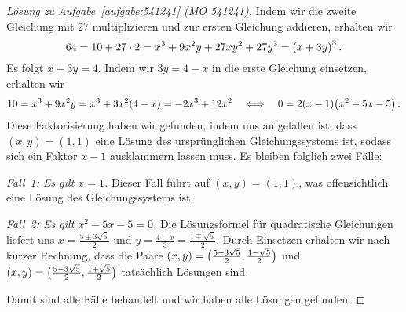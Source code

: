 \begin{proof}[Lösung zu Aufgabe~\ref{aufgabe:541241} \textmd{(\href{https://www.mathematik-olympiaden.de/moev/index.php?option=com_download&thema=a&format=raw&datei=A54124a.pdf}{MO 541241})}]
	Indem wir die zweite Gleichung mit $27$ multiplizieren und zur ersten Gleichung addieren, erhalten wir
	\begin{equation*}
		64=10+27\cdot 2=x^3+9x^2y+27xy^2+27y^3=\parens*{x+3y}^3\,.
	\end{equation*}
	Es folgt $x+3y=4$. Indem wir $3y=4-x$ in die erste Gleichung einsetzen, erhalten wir
	\begin{equation*}
		10=x^3+9x^2y=x^3+3x^2(4-x)=-2x^3+12x^2\quad\Longleftrightarrow\quad 0=2(x-1)\parens*{x^2-5x-5}\,.
	\end{equation*}
	Diese Faktorisierung haben wir gefunden, indem uns aufgefallen ist, dass $(x,y)=(1,1)$ eine Lösung des ursprünglichen Gleichungssystems ist, sodass sich ein Faktor $x-1$ ausklammern lassen muss. Es bleiben folglich zwei Fälle:
	
	\emph{Fall~1: Es gilt $x=1$.} Dieser Fall führt auf $(x,y)=(1,1)$, was offensichtlich eine Lösung des Gleichungssystems ist.
	
	
	\emph{Fall~2: Es gilt $x^2-5x-5=0$.} Die Lösungsformel für quadratische Gleichungen liefert uns $x=\frac{5\pm3\sqrt{5}}{2}$ und $y=\frac{4-x}{3}=\frac{1\mp\sqrt{5}}{2}$. Durch Einsetzen erhalten wir nach kurzer Rechnung, dass die Paare $(x,y)=\parens[\big]{\frac{5+3\sqrt{5}}{2},\frac{1-\sqrt{5}}{2}}$ und $(x,y)=\parens[\big]{\frac{5-3\sqrt{5}}{2},\frac{1+\sqrt{5}}{2}}$ tatsächlich Lösungen sind.
	
	Damit sind alle Fälle behandelt und wir haben alle Lösungen gefunden.
\end{proof}
